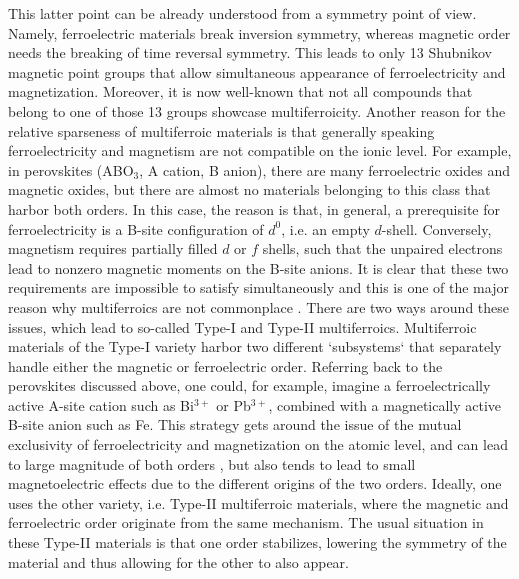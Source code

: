 This latter point can be already understood from a symmetry point of view.
Namely, ferroelectric materials break inversion symmetry, whereas magnetic order needs the breaking of time reversal symmetry.
This leads to only 13 Shubnikov magnetic point groups that allow simultaneous appearance of ferroelectricity and magnetization\cite{Wang2009}. Moreover, it is now well-known that not all compounds that belong to one of those 13 groups showcase multiferroicity.
Another reason for the relative sparseness of multiferroic materials is that generally speaking ferroelectricity and magnetism are not compatible on the ionic level.
For example, in perovskites (ABO$_3$, A cation, B anion), there are many ferroelectric oxides and magnetic oxides, but there are almost no materials belonging to this class that harbor both orders.
In this case, the reason is that, in general, a prerequisite for ferroelectricity is a B-site configuration of $d^0$, i.e. an empty $d$-shell.
Conversely, magnetism requires partially filled $d$ or $f$ shells, such that the unpaired electrons lead to nonzero magnetic moments on the B-site anions.
It is clear that these two requirements are impossible to satisfy simultaneously and this is one of the major reason why multiferroics are not commonplace .
There are two ways around these issues, which lead to so-called Type-I and Type-II multiferroics\cite{Khomskii2009}.
Multiferroic materials of the Type-I variety harbor two different `subsystems` that separately handle either the magnetic or ferroelectric order.
Referring back to the perovskites discussed above, one could, for example, imagine a ferroelectrically active A-site cation such as Bi$^{3+}$ or Pb$^{3+}$, combined with a magnetically active B-site anion such as Fe\cite{Wang2009}.
This strategy gets around the issue of the mutual exclusivity of ferroelectricity and magnetization on the atomic level, and can lead to large magnitude of both orders , but also tends to lead to small magnetoelectric effects due to the different origins of the two orders. 
Ideally, one uses the other variety, i.e. Type-II multiferroic materials, where the magnetic and ferroelectric order originate from the same mechanism.
The usual situation in these Type-II materials is that one order stabilizes, lowering the symmetry of the material and thus allowing for the other to also appear.
